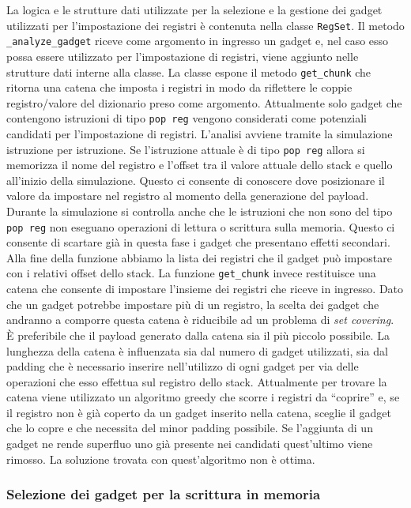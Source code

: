 La logica e le strutture dati utilizzate per la selezione e la
gestione dei gadget utilizzati per l'impostazione dei registri è
contenuta nella classe \lstinline{RegSet}. Il metodo
\lstinline{_analyze_gadget} riceve come argomento in ingresso un
gadget e, nel caso esso possa essere utilizzato per l'impostazione di
registri, viene aggiunto nelle strutture dati interne alla classe. La
classe espone il metodo \lstinline{get_chunk} che ritorna una catena
che imposta i registri in modo da riflettere le coppie registro/valore
del dizionario preso come argomento. Attualmente solo gadget che
contengono istruzioni di tipo \lstinline{pop reg} vengono considerati
come potenziali candidati per l'impostazione di registri. L'analisi
avviene tramite la simulazione istruzione per istruzione. Se
l'istruzione attuale è di tipo \lstinline{pop reg} allora si memorizza
il nome del registro e l'offset tra il valore attuale dello stack e
quello all'inizio della simulazione. Questo ci consente di conoscere
dove posizionare il valore da impostare nel registro al momento della
generazione del payload. Durante la simulazione si controlla anche che
le istruzioni che non sono del tipo \lstinline{pop reg} non eseguano
operazioni di lettura o scrittura sulla memoria. Questo ci consente di
scartare già in questa fase i gadget che presentano effetti
secondari. Alla fine della funzione abbiamo la lista dei registri che
il gadget può impostare con i relativi offset dello stack. La funzione
\lstinline{get_chunk} invece restituisce una catena che consente di
impostare l'insieme dei registri che riceve in ingresso. Dato che un
gadget potrebbe impostare più di un registro, la scelta dei gadget che
andranno a comporre questa catena è riducibile ad un problema di
\emph{set covering}. È preferibile che il payload generato dalla
catena sia il più piccolo possibile. La lunghezza della catena è
influenzata sia dal numero di gadget utilizzati, sia dal padding che è
necessario inserire nell'utilizzo di ogni gadget per via delle
operazioni che esso effettua sul registro dello stack. Attualmente per
trovare la catena viene utilizzato un algoritmo greedy che scorre i
registri da ``coprire'' e, se il registro non è già coperto da un
gadget inserito nella catena, sceglie il gadget che lo copre e che
necessita del minor padding possibile. Se l'aggiunta di un gadget ne
rende superfluo uno già presente nei candidati quest'ultimo viene
rimosso. La soluzione trovata con quest'algoritmo non è ottima.

\subsubsection{Selezione dei gadget per la scrittura in memoria}
\label{sec:memorystore}

